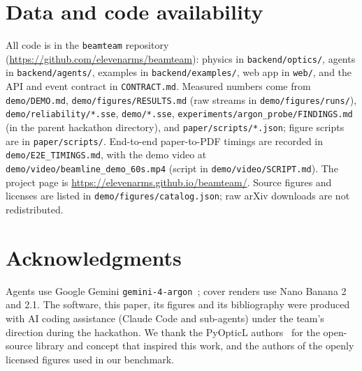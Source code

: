\documentclass[10pt,twocolumn,letterpaper]{article}
\newcommand{\code}[1]{\texttt{\small #1}}
\begin{document}
\section*{Data and code availability}
All code is in the \code{beamteam} repository (\url{https://github.com/elevenarms/beamteam}): physics in \code{backend/optics/}, agents in \code{backend/agents/}, examples in \code{backend/examples/}, web app in \code{web/}, and the API and event contract in \code{CONTRACT.md}. Measured numbers come from \code{demo/DEMO.md}, \code{demo/figures/RESULTS.md} (raw streams in \code{demo/figures/runs/}), \code{demo/reliability/*.sse}, \code{demo/*.sse}, \code{experiments/argon\_probe/FINDINGS.md} (in the parent hackathon directory), and \code{paper/scripts/*.json}; figure scripts are in \code{paper/scripts/}. End-to-end paper-to-PDF timings are recorded in \code{demo/E2E\_TIMINGS.md}, with the demo video at \code{demo/video/beamline\_demo\_60s.mp4} (script in \code{demo/video/SCRIPT.md}). The project page is \url{https://elevenarms.github.io/beamteam/}. Source figures and licenses are listed in \code{demo/figures/catalog.json}; raw arXiv downloads are not redistributed.

\section*{Acknowledgments}
Agents use Google Gemini \code{gemini-4-argon}~\cite{gemini2023}; cover renders use Nano Banana 2 and 2.1. The software, this paper, its figures and its bibliography were produced with AI coding assistance (Claude Code and sub-agents) under the team's direction during the hackathon. We thank the PyOpticL authors~\cite{pyopticl} for the open-source library and concept that inspired this work, and the authors of the openly licensed figures used in our benchmark.



\end{document}
